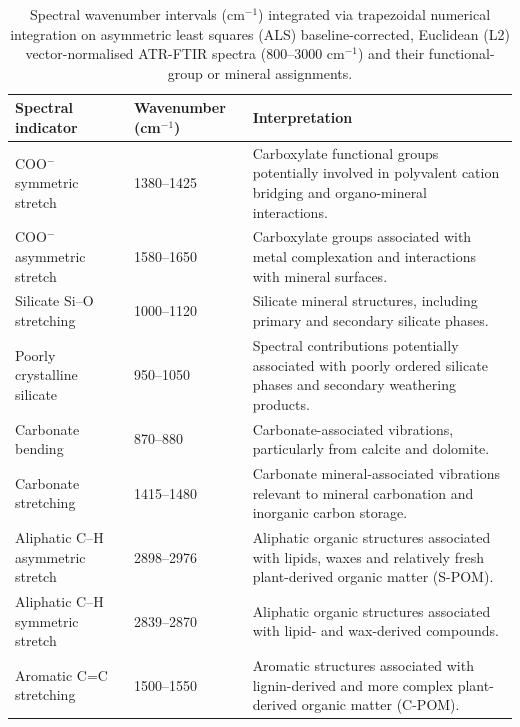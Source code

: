 \documentclass[preprint,12pt]{elsarticle}
\begin{document}
\newpage

\begin{table}[htbp]
\centering
\caption{Spectral wavenumber intervals (cm$^{-1}$) integrated via trapezoidal numerical integration on asymmetric least squares (ALS) baseline-corrected, Euclidean (L2) vector-normalised ATR-FTIR spectra (800--3000 cm$^{-1}$) and their functional-group or mineral assignments.}
\label{tab:ftir_bands}
\small
\renewcommand{\arraystretch}{1.25}
\begin{tabularx}{\textwidth}{p{3.1cm}p{2.4cm}X}
\hline
\textbf{Spectral indicator} &
\textbf{Wavenumber (cm$^{-1}$)} &
\textbf{Interpretation} \\
\hline

COO$^{-}$ symmetric stretch &
1380--1425 &
Carboxylate functional groups potentially involved in polyvalent cation bridging and organo-mineral interactions. \\

COO$^{-}$ asymmetric stretch &
1580--1650 &
Carboxylate groups associated with metal complexation and interactions with mineral surfaces. \\

Silicate Si--O stretching &
1000--1120 &
Silicate mineral structures, including primary and secondary silicate phases. \\

Poorly crystalline silicate &
950--1050 &
Spectral contributions potentially associated with poorly ordered silicate phases and secondary weathering products. \\

Carbonate bending &
870--880 &
Carbonate-associated vibrations, particularly from calcite and dolomite. \\

Carbonate stretching &
1415--1480 &
Carbonate mineral-associated vibrations relevant to mineral carbonation and inorganic carbon storage. \\

Aliphatic C--H asymmetric stretch &
2898--2976 &
Aliphatic organic structures associated with lipids, waxes and relatively fresh plant-derived organic matter (S-POM). \\

Aliphatic C--H symmetric stretch &
2839--2870 &
Aliphatic organic structures associated with lipid- and wax-derived compounds. \\

Aromatic C=C stretching &
1500--1550 &
Aromatic structures associated with lignin-derived and more complex plant-derived organic matter (C-POM). \\


\end{tabularx}
\end{table}
\end{document}
